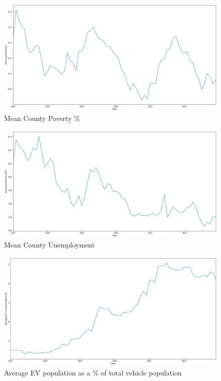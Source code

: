 \documentclass{article}
\begin{document}
\begin{figure}[!htb]
  \includegraphics[width=\linewidth]{mean county pov}
  \caption{Mean County Poverty \%}
\end{figure}

\begin{figure}[!htb]
  \includegraphics[width=\linewidth]{mean county unemp}
  \caption{Mean County Unemployment}
\end{figure}

\begin{figure}[!htb]
  \includegraphics[width=\linewidth]{evpop}
  \caption{Average EV population as a \% of total vehicle population}
\end{figure}

\newpage

\printbibliography[
title={References}
]
\end{document}
